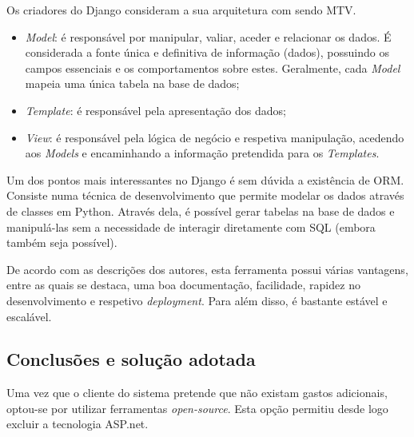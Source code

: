 Os criadores do Django consideram a sua arquitetura com sendo \ac{MTV}\cite{Index}. 

\begin{itemize}
	\item \textit{Model}: é responsável por manipular, valiar, aceder e relacionar os dados. É considerada a fonte única e definitiva de informação (dados), possuindo os campos essenciais e os comportamentos sobre estes. Geralmente, cada \textit{Model} mapeia uma única tabela na base de dados;
	
	
	\item \textit{Template}: é responsável pela apresentação dos dados; 

	\item \textit{View}: é responsável pela lógica de negócio e respetiva manipulação, acedendo aos \textit{Models} e encaminhando a informação pretendida para os \textit{Templates}. 
	
\end{itemize}




Um dos pontos mais interessantes no Django é sem dúvida a existência de \linebreak \ac{ORM}. Consiste numa técnica de desenvolvimento que permite modelar os dados através de classes em Python. Através dela, é possível gerar tabelas na base de dados e manipulá-las sem a necessidade de interagir diretamente com \ac{SQL} (embora também seja possível).

De acordo com as descrições dos autores, esta ferramenta possui várias vantagens, entre as quais se destaca, uma boa documentação, facilidade, rapidez no desenvolvimento e respetivo \textit{deployment}. Para além disso, é bastante estável e escalável\cite{Index}. 











\subsection{Conclusões e solução adotada}
\label{django-conclusao}


Uma vez que o cliente do sistema pretende que não existam gastos adicionais, optou-se por utilizar ferramentas \textit{open-source}. Esta opção permitiu desde logo excluir a tecnologia ASP.net. 


